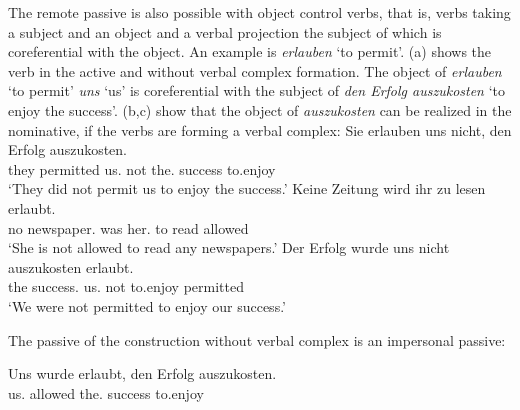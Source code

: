 The remote passive is also possible with object control verbs, that is, verbs taking a subject and
an object and a verbal projection the subject of which is coreferential with the object. An example
is \emph{erlauben} `to permit'. (a) shows the verb in the active and without verbal complex
formation. The object of \emph{erlauben} `to permit' \emph{uns} `us' is coreferential with the
subject of \emph{den Erfolg auszukosten} `to enjoy the success'. (b,c) show that the object
of \emph{auszukosten} can be realized in the nominative, if the verbs are forming a verbal complex:
\eal
\label{bsp-auskosten-fernpassiv}
\ex 
\gll Sie erlauben uns nicht, den Erfolg auszukosten.\\
     they permitted us.\DAT{} not the.\ACC{} success to.enjoy\\
\glt `They did not permit us to enjoy the success.'
\ex{}
\gll Keine Zeitung          wird ihr       zu lesen erlaubt.\footnotemark\\
     no    newspaper.\NOM{} was  her.\DAT{} to read  allowed\\
\glt `She is not allowed to read any newspapers.'%
\ex{}
\gll Der Erfolg         wurde  uns       nicht auszukosten erlaubt.\footnotemark\\
     the success.\NOM{} \AUX{} us.\DAT{} not   to.enjoy    permitted\\
\glt `We were not permitted to enjoy our success.'%
\label{bsp-auskosten-fernpassiv-haider}
\zl

\noindent
The passive of the construction without verbal complex is an impersonal passive:

\ea
\gll Uns       wurde  erlaubt, den        Erfolg  auszukosten.\\
     us.\DAT{} \AUX{} allowed  the.\ACC{} success to.enjoy\\
\z

